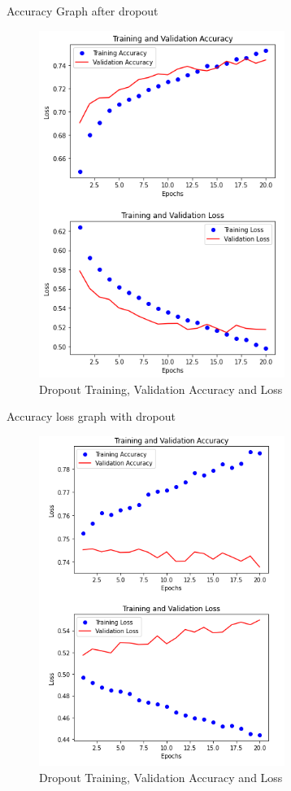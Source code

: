 \documentclass{article}
\begin{document}
\newpage
Accuracy Graph after dropout
\begin{figure}[h!]
    \centering
    \includegraphics[width=8cm]{dropout_validation.png}
    \caption{Dropout Training, Validation Accuracy and Loss}
    \label{fig:vg1_label}
\end{figure}

\newpage
Accuracy loss graph with dropout
\begin{figure}[h!]
    \centering
    \includegraphics[width=8cm]{acc_validation.png}
    \caption{Dropout Training, Validation Accuracy and Loss}
    \label{fig:vg3_label}
\end{figure}
\end{document}
